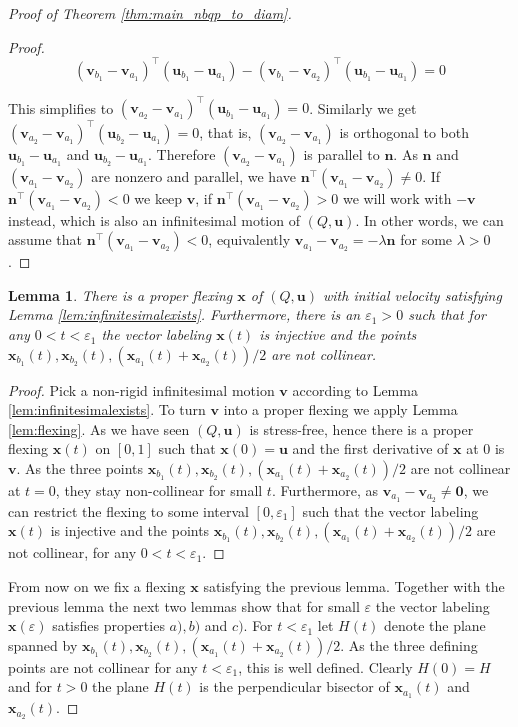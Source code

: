 \documentclass[10pt,a4paper]{article}
\newtheorem{lemma}[theorem]{Lemma}
\newcommand{\vu}[0]{\mathbf{u}}
\newcommand{\vv}[0]{\mathbf{v}}
\newcommand{\vn}[0]{\mathbf{n}}
\newcommand{\vx}[0]{\mathbf{x}}
\begin{document}
\begin{proof}[Proof of Theorem \ref{thm:main_nbqp_to_diam}]
\begin{proof}
        $$(\vv_{b_1}-\vv_{a_1})^\top(\vu_{b_1}-\vu_{a_1})-(\vv_{b_1}-\vv_{a_2})^\top(\vu_{b_1}-\vu_{a_1})=0$$

        This simplifies to $(\vv_{a_2}-\vv_{a_1})^\top(\vu_{b_1}-\vu_{a_1})=0$. Similarly we get $(\vv_{a_2}-\vv_{a_1})^\top(\vu_{b_2}-\vu_{a_1})=0$, that is, $(\vv_{a_2}-\vv_{a_1})$ is orthogonal to both  $\vu_{b_1}-\vu_{a_1}$ and $\vu_{b_2}-\vu_{a_1}$. Therefore $(\vv_{a_2}-\vv_{a_1})$ is parallel to $\vn$. As $\vn$ and $(\vv_{a_1}-\vv_{a_2})$ are nonzero and parallel, we have $\vn^\top (\vv_{a_1}-\vv_{a_2})\ne 0$. If $\vn^\top (\vv_{a_1}-\vv_{a_2})<0$ we keep $\vv$, if $\vn^\top (\vv_{a_1}-\vv_{a_2})>0$ we will work with $-\vv$ instead, which is also an infinitesimal motion of $(Q,\vu)$. In other words, we can assume that  $\vn^\top (\vv_{a_1}-\vv_{a_2})<0$,  equivalently $\vv_{a_1}-\vv_{a_2}=-\lambda\vn$ for some $\lambda>0$.
      \end{proof}
   
    
    
    \begin{lemma}\label{lem:injective}
        There is a proper flexing $\vx$ of $(Q,\vu)$ with initial velocity satisfying Lemma \ref{lem:infinitesimalexists}. Furthermore, there is an $\varepsilon_1>0$ such that for any $0<t<\varepsilon_1$ the vector labeling $\vx(t)$ is injective and the points $\vx_{b_1}(t),\vx_{b_2}(t),(\vx_{a_1}(t)+\vx_{a_2}(t))/2$ are not collinear.
    \end{lemma}
    \begin{proof}
    Pick a non-rigid infinitesimal motion $\vv$ according to Lemma \ref{lem:infinitesimalexists}. To turn $\vv$ into a proper flexing we apply Lemma \ref{lem:flexing}. As we have seen $(Q,\vu)$ is stress-free, hence  there is a proper flexing $\vx(t)$ on  $[0,1]$ such that $\vx(0)=\vu$ and the first derivative of $\vx$ at $0$ is $\vv$. As the three points $\vx_{b_1}(t),\vx_{b_2}(t),(\vx_{a_1}(t)+\vx_{a_2}(t))/2$ are not collinear at $t=0$, they stay non-collinear for small $t$. Furthermore, as $\vv_{a_1}-\vv_{a_2}\neq \mathbf{0}$, we can restrict the flexing to some interval $[0,\varepsilon_1]$ such that the vector labeling $\vx(t)$ is injective and the points $\vx_{b_1}(t),\vx_{b_2}(t),(\vx_{a_1}(t)+\vx_{a_2}(t))/2$ are not collinear, for any $0<t<\varepsilon_1$. 
        
    \end{proof}
    From now on we fix a flexing $\vx$ satisfying the previous lemma. Together with the previous lemma the next two lemmas show that for small $\varepsilon$ the vector labeling $\vx(\varepsilon)$ satisfies properties $a),b)$ and $c)$. For $t<\varepsilon_1$ let $H(t)$ denote the plane spanned by $\vx_{b_1}(t),\vx_{b_2}(t),(\vx_{a_1}(t)+\vx_{a_2}(t))/2$. As the three defining points are not collinear for any $t<\varepsilon_1$, this is well defined. Clearly $H(0)=H$ and for $t>0$ the plane $H(t)$ is the perpendicular bisector of  $\vx_{a_1}(t)$ and $\vx_{a_2}(t)$. 


\end{proof}
\end{document}
